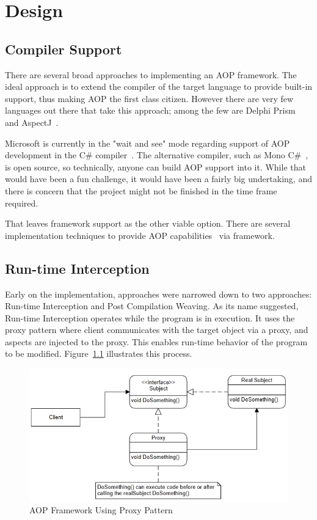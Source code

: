 \chapter{Design}

\section{Compiler Support}

There are several broad approaches to implementing an AOP framework. The ideal approach is to extend the compiler of the target language to provide built-in support, thus making AOP the first class citizen. However there are very few languages out there that take this approach; among the few are Delphi Prism~\cite{delphi_prism2010} and AspectJ~\cite{aspectj_faq, aspectj_text}. 

Microsoft is currently in the "wait and see" mode regarding support of AOP development in the C\# compiler~\cite{hejlsberg}. The alternative compiler, such as Mono C\#~\cite{monocsharp}, is open source, so technically, anyone can build AOP support into it. While that would have been a fun challenge, it would have been a fairly big undertaking, and there is concern that the project might not be finished in the time frame required.

That leaves framework support as the other viable option. There are several implementation techniques to provide AOP capabilities~\cite{aopcs, postsharp, aspectcs} via framework.

\section{Run-time Interception}

Early on the implementation, approaches were narrowed down to two approaches: Run-time Interception and Post Compilation Weaving. As its name suggested, Run-time Interception operates while the program is in execution. It uses the proxy pattern where client communicates with the target object via a proxy, and aspects are injected to the proxy. This enables run-time behavior of the program to be modified. Figure~\ref{proxy_model} illustrates this process.

\begin{figure}[H]
  \includegraphics[scale=1.0]{Proxy3.PNG}
  \centering
  \caption{AOP Framework Using Proxy Pattern\label{proxy_model}}
\end{figure}

